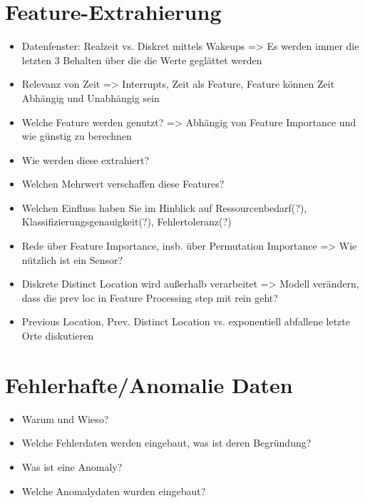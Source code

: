 \section{Feature-Extrahierung}
\begin{itemize}
    \item Datenfenster: Realzeit vs. Diskret mittels Wakeups => Es werden immer die letzten 3 Behalten über die die Werte geglättet werden
    \item Relevanz von Zeit => Interrupts, Zeit als Feature, Feature können Zeit Abhängig und Unabhängig sein
    \item Welche Feature werden genutzt? => Abhängig von Feature Importance und wie günstig zu berechnen
    \item Wie werden diese extrahiert?
    \item Welchen Mehrwert verschaffen diese Features?
    \item Welchen Einfluss haben Sie im Hinblick auf Ressourcenbedarf(?), Klassifizierungsgenauigkeit(?), Fehlertoleranz(?)
    \item Rede über Feature Importance, insb. über Permutation Importance => Wie nützlich ist ein Sensor?
    \item Diskrete Distinct Location wird außerhalb verarbeitet => Modell verändern, dass die prev loc in Feature Processing step mit rein geht?
    \item Previous Location, Prev. Distinct Location vs. exponentiell abfallene letzte Orte diskutieren
\end{itemize}

\section{Fehlerhafte/Anomalie Daten}
\begin{itemize}
    \item Warum und Wieso?
    \item Welche Fehlerdaten werden eingebaut, was ist deren Begründung?
    \item Was ist eine Anomaly?
    \item Welche Anomalydaten wurden eingebaut?
\end{itemize}

